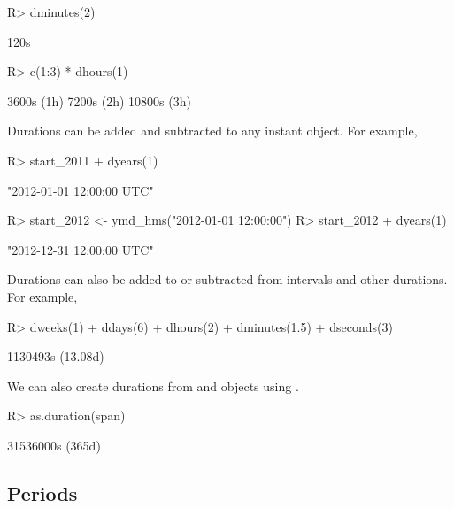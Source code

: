 \documentclass[article]{jss}
\begin{document}
\begin{CodeInput}
R> dminutes(2)
\end{CodeInput}
\begin{CodeOutput}
[1] 120s
\end{CodeOutput}

\begin{CodeInput}
R> c(1:3) * dhours(1)
\end{CodeInput}
\begin{CodeOutput}
[1]  3600s (1h)   7200s (2h)  10800s (3h)
\end{CodeOutput}

Durations can be added and subtracted to any instant object. For example,

\begin{CodeInput}
R> start_2011 + dyears(1)
\end{CodeInput}
\begin{CodeOutput}
[1] "2012-01-01 12:00:00 UTC"
\end{CodeOutput}

\begin{CodeInput}
R> start_2012 <- ymd_hms("2012-01-01 12:00:00")
R> start_2012 + dyears(1)
\end{CodeInput}
\begin{CodeOutput}
[1] "2012-12-31 12:00:00 UTC"
\end{CodeOutput}

Durations can also be added to or subtracted from intervals and other durations. For example,

\begin{CodeInput}
R> dweeks(1) + ddays(6) + dhours(2) + dminutes(1.5) + dseconds(3)
\end{CodeInput}
\begin{CodeOutput}
[1] 1130493s (13.08d)
\end{CodeOutput}

We can also create durations from  and  objects using .

\begin{CodeInput}
R> as.duration(span)
\end{CodeInput}
\begin{CodeOutput}
[1] 31536000s (365d)
\end{CodeOutput}


\subsection{Periods}
\label{sec:periods}
\end{document}
